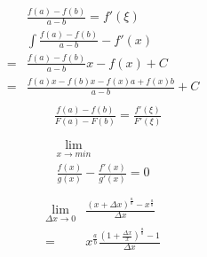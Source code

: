 \documentclass{article}
\begin{document}
  \begin{align}
    \begin{aligned} %
      & \frac{f\left( a \right) - f\left(b\right)}{a - b} = f'\left( \xi  \right) \\
      & \int \frac{f\left( a \right) - f\left(b\right)}{a - b} - f'\left( x  \right) \\
      =& \frac{f\left( a \right) - f\left(b\right)}{a - b} x - f\left( x \right) + C \\
      =& \frac{f\left( a \right) x - f\left(b\right) x - f\left(x\right) a + f\left(x\right) b}{a - b} + C
    \end{aligned}
  \end{align}
  \begin{align}
    \begin{aligned} %
      & \frac{f\left( a \right) - f\left(b\right)}{F\left(a\right) - F\left(b\right)} = \frac{f'\left( \xi  \right)}{F'\left( \xi \right)} \\
    \end{aligned}
  \end{align}
  \begin{align*}
    \lim_{x \to min} \\
    \frac{f\left(x\right)}{g\left(x\right)} - \frac{f'\left(x\right)}{g'\left(x\right)} = 0 \\
  \end{align*}
  \begin{align}
    \begin{aligned}
      \lim_{\Delta{x} \to 0}&\frac{\left(x+\Delta{x}\right)^{\frac{a}{b}} - x^{\frac{a}{b}}}{\Delta{x}} \\
      = &x^{\frac{a}{b}} \frac{ \left( 1 + \frac{\Delta{x}}{x} \right)^{\frac{a}{b}} - 1}{\Delta{x}} \\
    \end{aligned}
  \end{align}
\end{document}
